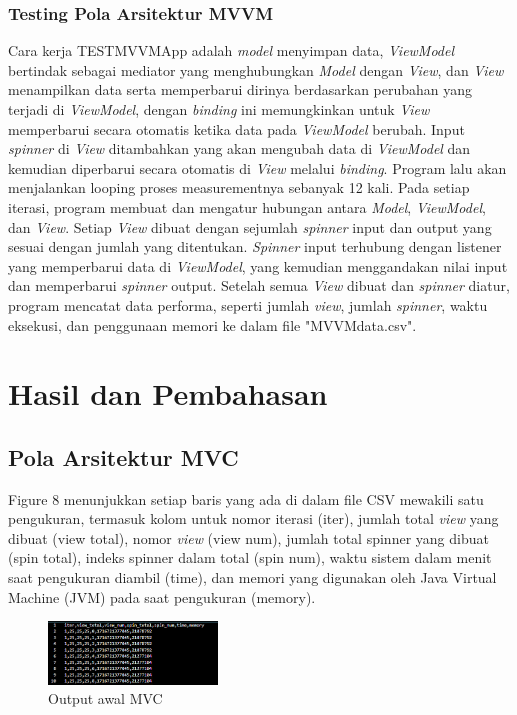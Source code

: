 \documentclass[conference]{IEEEtran}
\begin{document}
	\subsubsection{Testing Pola Arsitektur MVVM}
	Cara kerja TESTMVVMApp adalah \textit{model} menyimpan data, \textit{ViewModel} bertindak sebagai mediator yang menghubungkan \textit{Model} dengan \textit{View}, dan \textit{View} menampilkan data serta memperbarui dirinya berdasarkan perubahan yang terjadi di \textit{ViewModel}, dengan \textit{binding} ini memungkinkan untuk \textit{View} memperbarui secara otomatis ketika data pada \textit{ViewModel} berubah. Input \textit{spinner} di \textit{View} ditambahkan yang akan mengubah data di \textit{ViewModel} dan kemudian diperbarui secara otomatis di \textit{View} melalui \textit{binding}. Program lalu akan menjalankan looping proses measurementnya sebanyak 12 kali. Pada setiap iterasi, program membuat dan mengatur hubungan antara \textit{Model}, \textit{ViewModel}, dan \textit{View}. Setiap \textit{View} dibuat dengan sejumlah \textit{spinner} input dan output yang sesuai dengan jumlah yang ditentukan. \textit{Spinner} input terhubung dengan listener yang memperbarui data di \textit{ViewModel}, yang kemudian menggandakan nilai input dan memperbarui \textit{spinner} output. Setelah semua \textit{View} dibuat dan \textit{spinner} diatur, program mencatat data performa, seperti jumlah \textit{view}, jumlah \textit{spinner}, waktu eksekusi, dan penggunaan memori ke dalam file "MVVMdata.csv". 
	
	\section{Hasil dan Pembahasan}
	
	\subsection{Pola Arsitektur MVC}
	Figure 8 menunjukkan setiap baris yang ada di dalam file CSV mewakili satu pengukuran, termasuk kolom untuk nomor iterasi (iter), jumlah total \textit{view} yang dibuat (view total), nomor \textit{view} (view num), jumlah total spinner yang dibuat (spin total), indeks spinner dalam total (spin num), waktu sistem dalam menit saat pengukuran diambil (time), dan memori yang digunakan oleh Java Virtual Machine (JVM) pada saat pengukuran (memory). 
	
	\begin{figure}[h]
		\centering
		\includegraphics[width=0.4\textwidth]{images/MVC_Start}
		\caption{Output awal MVC}
		\label{fig:start_mvc}
	\end{figure}
	
\end{document}
